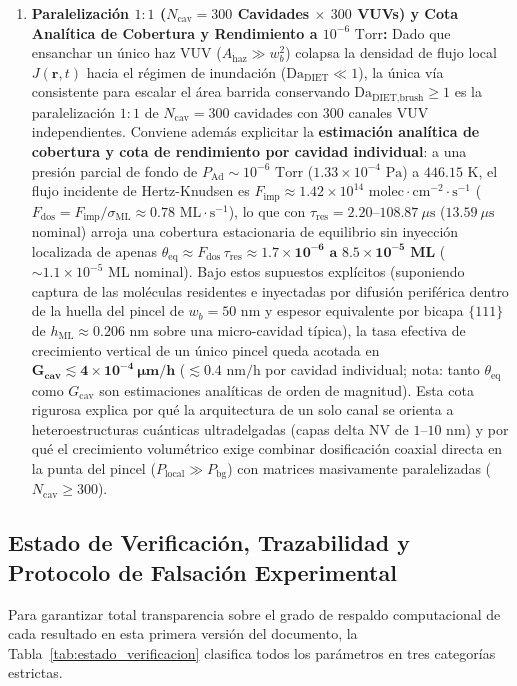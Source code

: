 \documentclass[10pt,twocolumn,a4paper]{article}
\begin{document}
\begin{enumerate}
    \item \textbf{Paralelización $1:1$ ($N_{\text{cav}} = 300$ Cavidades $\times$ $300$ VUVs) y Cota Analítica de Cobertura y Rendimiento a $10^{-6}\text{ Torr}$:} Dado que ensanchar un único haz VUV ($A_{\text{haz}} \gg w_b^2$) colapsa la densidad de flujo local $J(\mathbf{r},t)$ hacia el régimen de inundación ($\text{Da}_{\text{DIET}} \ll 1$), la única vía consistente para escalar el área barrida conservando $\text{Da}_{\text{DIET,brush}} \ge 1$ es la paralelización $1:1$ de $N_{\text{cav}} = 300$ cavidades con $300$ canales VUV independientes. Conviene además explicitar la \textbf{estimación analítica de cobertura y cota de rendimiento por cavidad individual}: a una presión parcial de fondo de $P_{\text{Ad}} \sim 10^{-6}\text{ Torr}$ ($1.33 \times 10^{-4}\text{ Pa}$) a $446.15\text{ K}$, el flujo incidente de Hertz-Knudsen es $F_{\text{imp}} \approx 1.42 \times 10^{14}\text{ molec}\cdot\text{cm}^{-2}\cdot\text{s}^{-1}$ ($F_{\text{dos}} = F_{\text{imp}}/\sigma_{\text{ML}} \approx 0.78\text{ ML}\cdot\text{s}^{-1}$), lo que con $\tau_{\text{res}} = 2.20\text{--}108.87\ \mu\text{s}$ ($13.59\ \mu\text{s}$ nominal) arroja una cobertura estacionaria de equilibrio sin inyección localizada de apenas $\theta_{\text{eq}} \approx F_{\text{dos}}\,\tau_{\text{res}} \approx \mathbf{1.7 \times 10^{-6}\text{ a }8.5 \times 10^{-5}\text{ ML}}$ ($\sim 1.1 \times 10^{-5}\text{ ML}$ nominal). Bajo estos supuestos explícitos (suponiendo captura de las moléculas residentes e inyectadas por difusión periférica dentro de la huella del pincel de $w_b = 50\text{ nm}$ y espesor equivalente por bicapa $\{111\}$ de $h_{\text{ML}} \approx 0.206\text{ nm}$ sobre una micro-cavidad típica), la tasa efectiva de crecimiento vertical de un único pincel queda acotada en $\mathbf{G_{\text{cav}} \lesssim 4 \times 10^{-4}\ \mu\text{m/h}}$ ($\lesssim 0.4\text{ nm/h}$ por cavidad individual; nota: tanto $\theta_{\text{eq}}$ como $G_{\text{cav}}$ son estimaciones analíticas de orden de magnitud). Esta cota rigurosa explica por qué la arquitectura de un solo canal se orienta a heteroestructuras cuánticas ultradelgadas (capas delta NV de $1\text{--}10\text{ nm}$) y por qué el crecimiento volumétrico exige combinar dosificación coaxial directa en la punta del pincel ($P_{\text{local}} \gg P_{\text{bg}}$) con matrices masivamente paralelizadas ($N_{\text{cav}} \ge 300$).
\end{enumerate}

\subsection{Estado de Verificación, Trazabilidad y Protocolo de Falsación Experimental}
Para garantizar total transparencia sobre el grado de respaldo computacional de cada resultado en esta primera versión del documento, la Tabla~\ref{tab:estado_verificacion} clasifica todos los parámetros en tres categorías estrictas.
\end{document}
